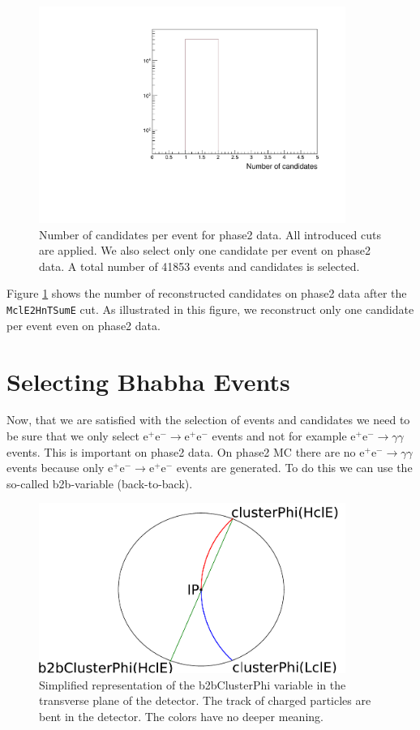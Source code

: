 \documentclass[a4paper,11pt,twosided,final,german,openbib,pdftex,listof=totoc,bibliography=totoc]{scrbook}
\begin{document}
\begin{figure}[h!]
	\centering
	\includegraphics[width=10cm]{Cuts/Data/nCandData.pdf}
	\caption[Number Of Candidates Per Event for Phase2 Data (All Cuts)]{Number of candidates per event for phase2 data. All introduced cuts are applied. We also select only one candidate per event on phase2 data. A total number of 41853 events and candidates is selected.}
	\label{fig:nCandData}
\end{figure}

Figure \ref{fig:nCandData} shows the number of reconstructed candidates on phase2 data after the \texttt{MclE2HnTSumE} cut. As illustrated in this figure, we reconstruct only one candidate per event even on phase2 data.



\section{Selecting Bhabha Events}
\label{sec:SelectingElectronPositron}

Now, that we are satisfied with the selection of events and candidates we need to be sure that we only select $\textrm{e}^+ \textrm{e}^- \rightarrow \textrm{e}^+ \textrm{e}^-$ events and not for example $\textrm{e}^+ \textrm{e}^- \rightarrow \gamma \gamma$ events. This is important on phase2 data. On phase2 MC there are no $\textrm{e}^+ \textrm{e}^- \rightarrow \gamma \gamma$ events because only $\textrm{e}^+ \textrm{e}^- \rightarrow \textrm{e}^+ \textrm{e}^-$ events are generated. To do this we can use the so-called b2b-variable (back-to-back).

\begin{figure}[h!]
	\centering
	\includegraphics[width=10cm]{Bilder/b2b_2}
	\caption[Sketch Of The b2bClusterPhi Variable]{Simplified representation of the b2bClusterPhi variable in the transverse plane of the detector. The track of charged particles are bent in the detector. The colors have no deeper meaning.}
	\label{fig:Sketchb2b}
\end{figure}
\end{document}
